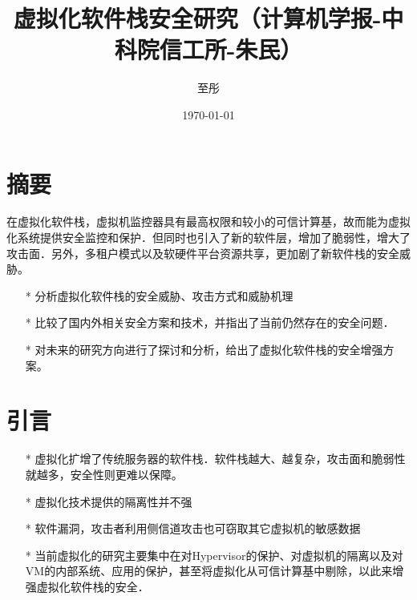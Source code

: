 \documentclass[UTF8]{ctexart}
\title{\heiti 虚拟化软件栈安全研究（计算机学报-中科院信工所-朱民）}
\author{\kaishu 至彤}
\date{\today}
\begin{document}
    
    \maketitle

    \clearpage
    \section{摘要}\label{sec:diyijie}
	在虚拟化软件栈，虚拟机监控器具有最高权限和较小的可信计算基，故而能为虚拟化系统提供安全监控和保护．但同时也引入了新的软件层，增加了脆弱性，增大了攻击面．另外，多租户模式以及软硬件平台资源共享，更加剧了新软件栈的安全威胁。
	\begin{itemize}
	\item[*] 分析虚拟化软件栈的安全威胁、攻击方式和威胁机理
	\item[*] 比较了国内外相关安全方案和技术，并指出了当前仍然存在的安全问题．
	\item[*] 对未来的研究方向进行了探讨和分析，给出了虚拟化软件栈的安全增强方案。
	\end{itemize}
	\clearpage
	
    \section{引言}\label{sec:dierjie}
	\begin{itemize}
	\item[*] 虚拟化扩增了传统服务器的软件栈．软件栈越大、越复杂，攻击面和脆弱性就越多，安全性则更难以保障。
	\item[*] 虚拟化技术提供的隔离性并不强
	\item[*] 软件漏洞，攻击者利用侧信道攻击也可窃取其它虚拟机的敏感数据
	\item[*] 当前虚拟化的研究主要集中在对Hypervisor的保护、对虚拟机的隔离以及对VM的内部系统、应用的保护，甚至将虚拟化从可信计算基中剔除，以此来增强虚拟化软件栈的安全．
	\end{itemize}
	\clearpage
	
	
\end{document}
